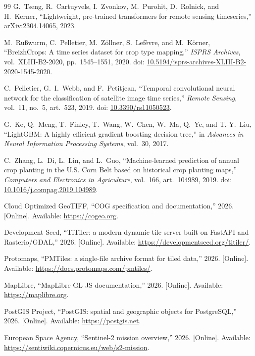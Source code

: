 \begin{thebibliography}{99}
G.~Tseng, R.~Cartuyvels, I.~Zvonkov, M.~Purohit, D.~Rolnick, and H.~Kerner, ``Lightweight, pre-trained
transformers for remote sensing timeseries,'' arXiv:2304.14065, 2023.

M.~Ru{\ss}wurm, C.~Pelletier, M.~Z{\"o}llner, S.~Lef{\`e}vre, and M.~K{\"o}rner, ``BreizhCrops: A time
series dataset for crop type mapping,'' \textit{ISPRS Archives}, vol.~XLIII-B2-2020, pp.~1545--1551,
2020. doi: \href{https://doi.org/10.5194/isprs-archives-XLIII-B2-2020-1545-2020}{10.5194/isprs-archives-XLIII-B2-2020-1545-2020}.

C.~Pelletier, G.~I.~Webb, and F.~Petitjean, ``Temporal convolutional neural network for the
classification of satellite image time series,'' \textit{Remote Sensing}, vol.~11, no.~5, art.~523,
2019. doi: \href{https://doi.org/10.3390/rs11050523}{10.3390/rs11050523}.

G.~Ke, Q.~Meng, T.~Finley, T.~Wang, W.~Chen, W.~Ma, Q.~Ye, and T.-Y.~Liu, ``LightGBM: A highly
efficient gradient boosting decision tree,'' in \textit{Advances in Neural Information Processing
Systems}, vol.~30, 2017.

C.~Zhang, L.~Di, L.~Lin, and L.~Guo, ``Machine-learned prediction of annual crop planting in the U.S.
Corn Belt based on historical crop planting maps,'' \textit{Computers and Electronics in
Agriculture}, vol.~166, art.~104989, 2019.
doi: \href{https://doi.org/10.1016/j.compag.2019.104989}{10.1016/j.compag.2019.104989}.

Cloud Optimized GeoTIFF, ``COG specification and documentation,'' 2026. [Online]. Available:
\url{https://cogeo.org}.

Development Seed, ``TiTiler: a modern dynamic tile server built on FastAPI and Rasterio/GDAL,''
2026. [Online]. Available: \url{https://developmentseed.org/titiler/}.

Protomaps, ``PMTiles: a single-file archive format for tiled data,'' 2026. [Online]. Available:
\url{https://docs.protomaps.com/pmtiles/}.

MapLibre, ``MapLibre GL JS documentation,'' 2026. [Online]. Available: \url{https://maplibre.org}.

PostGIS Project, ``PostGIS: spatial and geographic objects for PostgreSQL,'' 2026. [Online].
Available: \url{https://postgis.net}.

European Space Agency, ``Sentinel-2 mission overview,'' 2026. [Online]. Available:
\url{https://sentiwiki.copernicus.eu/web/s2-mission}.


\end{thebibliography}
